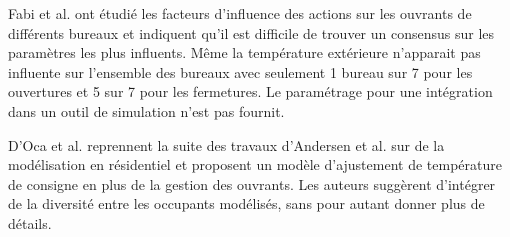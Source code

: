 Fabi et al. \cite{Fabi-14} ont étudié les facteurs d'influence des actions sur les ouvrants de différents bureaux et indiquent qu'il est difficile de trouver un consensus sur les paramètres les plus influents. Même la température extérieure n'apparait pas influente sur l'ensemble des bureaux avec seulement 1 bureau sur 7 pour les ouvertures et 5 sur 7 pour les fermetures. Le paramétrage pour une intégration dans un outil de simulation n'est pas fournit.

D'Oca et al. \cite{d'Oca-14} reprennent la suite des travaux d'Andersen et al. \cite{Andersen-13} sur de la modélisation en résidentiel et proposent un modèle d'ajustement de température de consigne en plus de la gestion des ouvrants. Les auteurs suggèrent d'intégrer de la diversité entre les occupants modélisés, sans pour autant donner plus de détails.

